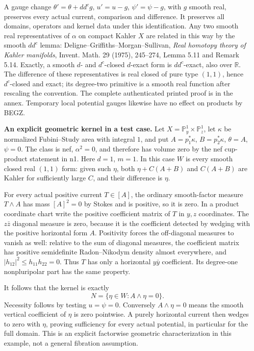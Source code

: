 \documentclass[
  11pt,
]{article}
\begin{document}
A gauge change \(\theta' =\theta+dd^cg\), \(u'=u-g\), \(\psi'=\psi-g\),
with \(g\) smooth real, preserves every actual current, comparison and
difference. It preserves all domains, operators and kernel data under
this identification. Any two smooth real representatives of \(\alpha\)
on compact Kahler \(X\) are related in this way by the smooth \(dd^c\)
lemma: Deligne--Griffiths--Morgan--Sullivan, \emph{Real homotopy theory
of Kahler manifolds}, Invent. Math. 29 (1975), 245--274, Lemma 5.11 and
Remark 5.14. Exactly, a smooth \(d\)- and \(d^c\)-closed \(d\)-exact
form is \(dd^c\)-exact, also over \(\mathbb R\). The difference of these
representatives is real closed of pure type \((1,1)\), hence
\(d^c\)-closed and exact; its degree-two primitive is a smooth real
function after rescaling the convention. The complete authenticated
printed proof is in the annex. Temporary local potential gauges likewise
have no effect on products by BEGZ.

\textbf{An explicit geometric kernel in a test case.} Let
\(X=\mathbb P^1_y\times\mathbb P^1_z\), let \(\kappa\) be normalized
Fubini--Study area with integral \(1\), and put \(A=p_1^*\kappa\),
\(B=p_2^*\kappa\), \(\theta=A\), \(\psi=0\). The class is nef,
\(\alpha^2=0\), and therefore has volume zero by the nef cup-product
statement in n1. Here \(d=1\), \(m=1\). In this case \(W\) is every
smooth closed real \((1,1)\) form: given such \(\eta\), both
\(\eta+C(A+B)\) and \(C(A+B)\) are Kahler for sufficiently large \(C\),
and their difference is \(\eta\).

For every actual positive current \(T\in[A]\), the ordinary
smooth-factor measure \(T\wedge A\) has mass \([A]^2=0\) by Stokes and
is positive, so it is zero. In a product coordinate chart write the
positive coefficient matrix of \(T\) in \(y,z\) coordinates. The
\(z\bar z\) diagonal measure is zero, because it is the coefficient
detected by wedging with the positive horizontal form \(A\). Positivity
forces the off-diagonal measures to vanish as well: relative to the sum
of diagonal measures, the coefficient matrix has positive semidefinite
Radon--Nikodym density almost everywhere, and
\(|h_{12}|^2\leq h_{11}h_{22}=0\). Thus \(T\) has only a horizontal
\(y\bar y\) coefficient. Its degree-one nonpluripolar part has the same
property.

It follows that the kernel is exactly \[
N=\{\eta\in W:A\wedge\eta=0\}. \tag{Q6}
\] Necessity follows by testing \(u=\psi=0\). Conversely
\(A\wedge\eta=0\) means the smooth vertical coefficient of \(\eta\) is
zero pointwise. A purely horizontal current then wedges to zero with
\(\eta\), proving sufficiency for every actual potential, in particular
for the full domain. This is an explicit factorwise geometric
characterization in this example, not a general fibration assumption.
\end{document}
